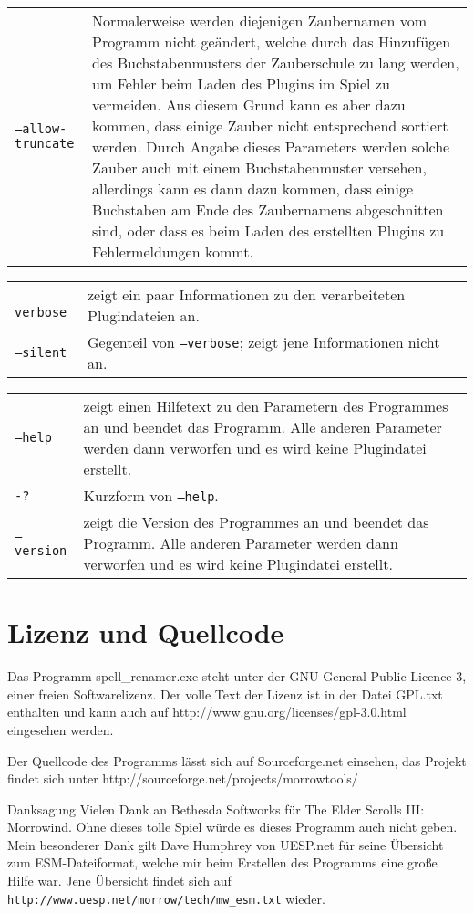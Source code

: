 \documentclass[12pt,twoside,a4paper]{article}
\begin{document}
\begin{tabular}{p{7cm} p{8cm}}
\texttt{--allow-truncate}         & Normalerweise werden diejenigen Zaubernamen vom Programm nicht ge\"{a}ndert, welche durch das Hinzuf\"{u}gen des Buchstabenmusters der Zauberschule zu lang werden, um Fehler beim Laden des Plugins im Spiel zu vermeiden. Aus diesem Grund kann es aber dazu kommen, dass einige Zauber nicht entsprechend sortiert werden. Durch Angabe dieses Parameters werden solche Zauber auch mit einem Buchstabenmuster versehen, allerdings kann es dann dazu kommen, dass einige Buchstaben am Ende des Zaubernamens abgeschnitten sind, oder dass es beim Laden des erstellten Plugins zu Fehlermeldungen kommt.\\
\end{tabular}
\newline
\begin{tabular}{p{7cm} p{8cm}}
\texttt{--verbose}                & zeigt ein paar Informationen zu den verarbeiteten Plugindateien an.\\
\texttt{--silent}                 & Gegenteil von \texttt{--verbose}; zeigt jene Informationen nicht an.\\
\end{tabular}
\newline
\begin{tabular}{p{7cm} p{8cm}}
\texttt{--help}                   & zeigt einen Hilfetext zu den Parametern des Programmes an und beendet das Programm. Alle anderen Parameter werden dann verworfen und es wird keine Plugindatei erstellt.\\
\texttt{-?}                       & Kurzform von \texttt{--help}.\\
\texttt{--version}                & zeigt die Version des Programmes an und beendet das Programm. Alle anderen Parameter werden dann verworfen und es wird keine Plugindatei erstellt.\\
\end{tabular}

\section{Lizenz und Quellcode}
Das Programm spell\_renamer.exe steht unter der GNU General Public Licence 3,
einer freien Softwarelizenz. Der volle Text der Lizenz ist in der Datei GPL.txt
enthalten und kann auch auf http://www.gnu.org/licenses\slash gpl-3.0.html eingesehen werden.

Der Quellcode des Programms l\"{a}sst sich auf Sourceforge.net einsehen, das Projekt
findet sich unter http://sourceforge.net/projects/morrowtools/

\begin{section}{Danksagung}
Vielen Dank an Bethesda Softworks f\"{u}r The Elder Scrolls III: Morrowind.
Ohne dieses tolle Spiel w\"{u}rde es dieses Programm auch nicht geben.\\
Mein besonderer Dank gilt Dave Humphrey von UESP.net f\"{u}r seine \"{U}bersicht
zum ESM-Dateiformat, welche mir beim Erstellen des Programms eine gro\ss{}e
Hilfe war. Jene \"{U}bersicht findet sich auf \texttt{http://www.uesp.net/morrow\slash tech/mw\_esm.txt}
wieder.
\end{section}
\end{document}
